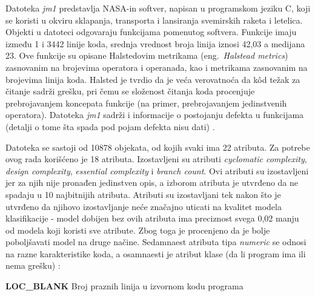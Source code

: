 \documentclass[12pt,oneside]{memoir}
\begin{document}


Datoteka \textit{jm1} predstavlja NASA-in softver, napisan u programskom jeziku C, koji se koristi u okviru sklapanja, transporta i lansiranja svemirskih raketa i letelica. Objekti u datoteci odgovaraju funkcijama pomenutog softvera. Funkcije imaju između 1 i 3442 linije koda, srednja vrednost broja linija iznosi 42,03 a medijana 23. Ove funkcije su opisane Halstedovim metrikama (eng.~\textit{Halstead metrics}) zasnovanim na brojevima operatora i operanada, kao i metrikama zasnovanim na brojevima linija koda. Halsted je tvrdio da je veća verovatnoća da k\^od težak za čitanje sadrži grešku, pri čemu se složenost čitanja koda procenjuje prebrojavanjem koncepata funkcije (na primer, prebrojavanjem jedinstvenih operatora). Datoteka \textit{jm1} sadrži i informacije o postojanju defekta u funkcijama (detalji o tome šta spada pod pojam defekta nisu dati) \cite{jm1, ground_system, halstead77}. 




Datoteka se sastoji od 10878 objekata, od kojih svaki ima 22 atributa. Za potrebe ovog rada korišćeno je 18 atributa.  Izostavljeni su atributi \textit{cyclomatic complexity}, \textit{design complexity}, \textit{essential complexity} i \textit{branch count}. Ovi atributi su izostavljeni jer za njih nije pronađen jedinstven opis, a izborom atributa je utvrđeno da ne spadaju u 10 najbitnijih atributa. Atributi su izostavljani tek nakon što je utvrđeno da njihovo izostavljanje neće značajno uticati na kvalitet modela klasifikacije - model dobijen bez ovih atributa ima preciznost svega 0,02 manju od modela koji koristi sve atribute. Zbog toga je procenjeno da je bolje poboljšavati model na druge načine. Sedamnaest atributa tipa \textit{numeric} se odnosi na razne karakteristike koda, a osamnaesti je atribut klase (da li program ima ili nema grešku) \cite{jm1, SLOC}: 

\textbf{LOC\_BLANK} Broj praznih linija u izvornom kodu programa
\end{document}

